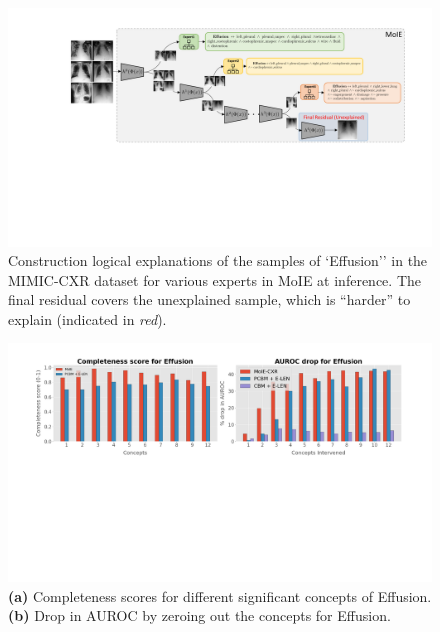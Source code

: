 \begin{figure}[h]
\centering
\includegraphics[width=1.0\textwidth]
{figures/Supp/mimic_concept_explanation.pdf}
\caption{Construction logical explanations of the samples of `Effusion'' in the MIMIC-CXR dataset for various experts in MoIE at inference. The final residual covers the unexplained sample, which is ``harder'' to explain (indicated in \emph{red}).}
\label{fig:mimic_concept_explanation}
\end{figure}

\begin{figure}[h]
\centering
\includegraphics[width=1.0\textwidth]
{figures/Supp/mimic_concept_quant.pdf}
\caption{\textbf{(a)} Completeness scores for different significant concepts of Effusion.  \textbf{(b)} Drop in AUROC by zeroing out the concepts for Effusion.}
\label{fig:mimic_concept_quant}
\end{figure}

